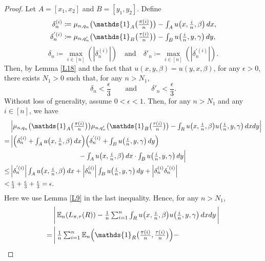 \begin{proof}
Let $A = [x_1, x_2]$ and $B = [y_1, y_2]$. Define
\begin{align*}
\delta_n^{(i)} &\coloneqq \textstyle\n \big(\mathds{1}_A\big(\frac{\pi(i)}{n}\big) \big) - \int_A u\big(x, \frac{i}{n}, \beta \big)\, dx, \\
\delta_n^{'(i)} &\coloneqq \textstyle\mu_{n, q'_n} \big(\mathds{1}_B\big(\frac{\tau(i)}{n}\big) \big) -
       \int_B u\big(\frac{i}{n}, y, \gamma \big)\, dy,
\end{align*}
\[
\delta_n \coloneqq \max_{i \in [n]}( |\delta_n^{(i)}|) \quad \text{and} \quad
\delta'_n \coloneqq \max_{i \in [n]}( |\delta_n^{'(i)}|).
\]
Then, by Lemma \ref{L18} and the fact that $u(x, y, \beta) = u(y, x, \beta)$, for any $\epsilon > 0$, there exists $N_1 > 0$ such that,
for any $n > N_1$,
\[
\delta_n < \frac{\epsilon}{3} \qquad \text{and} \qquad \delta'_n < \frac{\epsilon}{3}.
\]
Without loss of generality, assume $0 < \epsilon < 1$. Then, for any $n > N_1$ and any $i \in [n]$, we have
\begin{align}
   &\textstyle\Big| \n \big(\mathds{1}_A\big(\frac{\pi(i)}{n}\big) \big) \mu_{n, q'_n} \big(\mathds{1}_B\big(\frac{\tau(i)}{n}\big) \big) -
     \int_R u\big(x, \frac{i}{n}, \beta \big)u\big(\frac{i}{n}, y, \gamma \big)\, dxdy \Big| \label{eq:L100d}\\
  =\,&\textstyle\Big|\Big(\delta_n^{(i)} + \int_A u\big(x, \frac{i}{n}, \beta \big)\, dx \Big)
           \Big(\delta_n^{'(i)} + \int_B u\big(\frac{i}{n}, y, \gamma \big)\, dy \Big) \nonumber\\
    &\textstyle\qquad\qquad\qquad\qquad\qquad
    - \int_A u\big(x, \frac{i}{n}, \beta \big)\, dx \cdot \int_B u\big(\frac{i}{n}, y, \gamma \big)\, dy \Big| \nonumber\\
  \le\,&\textstyle \Big|\delta_n^{'(i)}\Big| \int_A u\big(x, \frac{i}{n}, \beta \big)\, dx +
         \Big|\delta_n^{(i)}\Big| \int_B u\big(\frac{i}{n}, y, \gamma \big)\, dy + \Big|\delta_n^{(i)}\delta_n^{'(i)}\Big| \nonumber\\
  <\,&\textstyle \frac{\epsilon}{3} + \frac{\epsilon}{3} + \frac{\epsilon}{3} = \epsilon. \nonumber
\end{align}
Here we use Lemma \ref{L9} in the last inequality. Hence, for any $n > N_1$,
\begin{align}
  &\textstyle\bigg|\, \E_n (L_{\pi, \tau}(R)) -
         \frac{1}{n}\sum_{i=1}^{n}\int_R u\big(x, \frac{i}{n}, \beta \big)u\big(\frac{i}{n}, y, \gamma \big)\, dxdy \, \bigg|  \label{eq:L100e}\\
  =\,&\textstyle\bigg|\, \frac{1}{n}\sum_{i=1}^{n} \E_n \Big(\mathds{1}_R\big(\frac{\pi(i)}{n}, \frac{\tau(i)}{n}\big)\Big) -

\end{align}
\end{proof}
